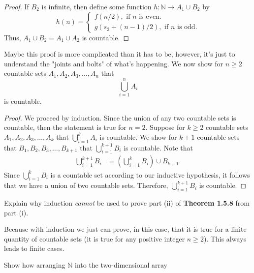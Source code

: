 \documentclass[12pt]{article}
\newcommand{\N}{\mathbb{N}}
\newenvironment{problem}[2][Problem]{\begin{trivlist}
		\item[\hskip \labelsep {\bfseries #1}\hskip \labelsep {\bfseries #2.}]}{\end{trivlist}}
\newenvironment{solution}[2][Solution]{\begin{trivlist}
		\item[\hskip \labelsep {\bfseries #1}\hskip \labelsep {\bfseries #2.}]}{\end{trivlist}}
\begin{document}
\begin{problem}{1.5.3}
\begin{enumerate}[label=(\alph*)]
\begin{solution}{(a)}
\begin{proof}
				If $B_{2}$ is infinite, then define some function $h:\N \to A_{1}\cup B_{2}$ by
					\begin{equation*}
						h(n) = \begin{cases}
							f(n/2), \text{ if }n \text{ is even}.\\
							g(s_{2} + (n-1)/2), \text{ if }n \text{ is odd}.
						\end{cases}
					\end{equation*}
				Thus, $A_{1}\cup B_{2} = A_{1}\cup A_{2}$ is countable. 
				\end{proof}
			Maybe this proof is more complicated than it has to be, however, it's just to understand the "joints and bolts" of what's happening. We now show for $n\geq 2$ countable sets $A_{1},A_{2},A_{3},\ldots, A_{n}$ that
			\begin{equation*}
				\bigcup_{i=1}^{n} A_{i} 
			\end{equation*}
			is countable.
			\begin{proof}
				We proceed by induction. Since the union of any two countable sets is countable, then the statement is true for $n=2$. Suppose for $k\geq 2$ countable sets $A_{1},A_{2},A_{3},\ldots,A_{k}$ that $\bigcup_{i=1}^{k} A_{i}$ is countable. We show for $k+1$ countable sets that $B_{1},B_{2},B_{3},\ldots,B_{k+1}$ that $\bigcup_{i=1}^{k+1} B_{i}$ is countable. Note that
				\begin{align*}
					\bigcup_{i=1}^{k+1} B_{i} &= \left(\bigcup_{i=1}^{k} B_{i}\right)\cup B_{k+1}.
				\end{align*}
			Since $\bigcup_{i=1}^{k} B_{i}$ is a countable set according to our inductive hypothesis, it follows that we have a union of two countable sets. Therefore, $\bigcup_{i=1}^{k+1} B_{i}$ is countable.
			\end{proof}
			\end{solution}
			\item Explain why induction \textit{cannot} be used to prove part (ii) of \textbf{Theorem 1.5.8} from part (i).
			\begin{solution}{(c)}
				Because with induction we just can prove, in this case, that it is true for a finite quantity of countable sets (it is true for any positive integer $n\geq 2$). This always leads to finite cases. 
			\end{solution}
			\item Show how arranging $\N$ into the two-dimensional array
			\begin{center}
			\begin{tabular}{c c c c c c}

\end{tabular}
\end{center}
\end{enumerate}
\end{problem}
\end{document}
